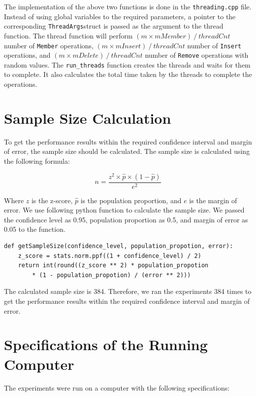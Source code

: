 \documentclass[a4paper,12pt]{article}
\begin{document}
The implementation of the above two functions is done in the \lstinline|threading.cpp| file. Instead of using global variables to the required parameters, a pointer to the corresponding \lstinline|ThreadArgs|struct is passed as the argument to the thread function. The thread function will perform \( (m \times mMember)\ /\ threadCnt \) number of \lstinline|Member| operations, \( (m \times mInsert)\ /\ threadCnt \) number of \lstinline|Insert| operations, and \( (m \times mDelete)\ /\ threadCnt \) number of \lstinline|Remove| operations with random values. The \lstinline|run_threads| function creates the threads and waits for them to complete. It also calculates the total time taken by the threads to complete the operations.

\section{Sample Size Calculation}

To get the performance results within the required confidence interval and margin of error,
the sample size should be calculated. The sample size is calculated using the following formula:

\[
    n = \frac{z^2 \times \hat{p} \times (1 - \hat{p})}{e^2}
\]

Where \( z \) is the z-score, \( \hat{p} \) is the population proportion, and \( e \) is the margin of error.
We use following python function to calculate the sample size. We passed the confidence level as 0.95,
population proportion as 0.5, and margin of error as 0.05 to the function.

\lstset{style=pystyle}

\begin{lstlisting}
def getSampleSize(confidence_level, population_propotion, error):
    z_score = stats.norm.ppf((1 + confidence_level) / 2)
    return int(round((z_score ** 2) * population_propotion 
        * (1 - population_propotion) / (error ** 2)))
\end{lstlisting}

The calculated sample size is 384. Therefore, we ran the experiments 384 times to get the performance
results within the required confidence interval and margin of error.

\section{Specifications of the Running Computer}

The experiments were run on a computer with the following specifications:
\end{document}
